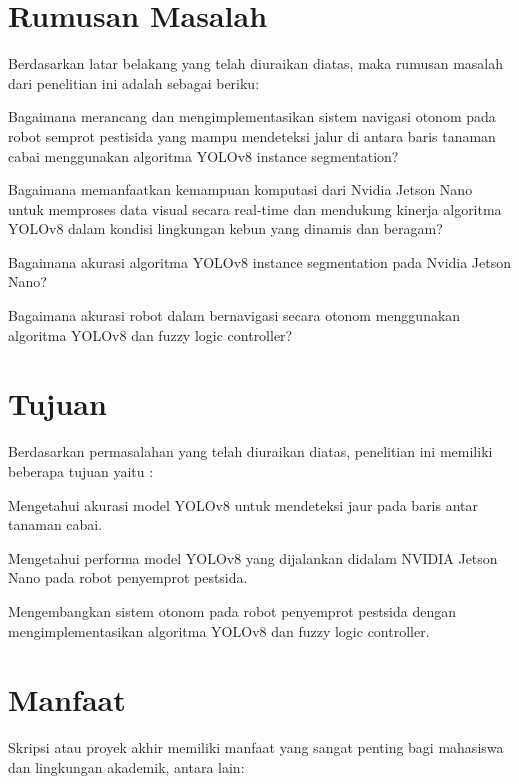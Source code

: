 \section{Rumusan Masalah}
Berdasarkan latar belakang yang telah diuraikan diatas, maka rumusan
masalah dari penelitian ini adalah sebagai beriku:
\begin{packed_enum}
	\item Bagaimana merancang dan mengimplementasikan sistem navigasi otonom pada robot semprot pestisida yang mampu mendeteksi jalur di antara baris tanaman cabai menggunakan algoritma YOLOv8 instance segmentation?
	\item Bagaimana memanfaatkan kemampuan komputasi dari Nvidia Jetson Nano untuk memproses data visual secara real-time dan mendukung kinerja algoritma YOLOv8 dalam kondisi lingkungan kebun yang dinamis dan beragam?
	\item Bagaimana akurasi  algoritma YOLOv8 instance segmentation pada Nvidia Jetson Nano?
	\item Bagaimana akurasi robot dalam bernavigasi secara otonom menggunakan algoritma YOLOv8 dan  fuzzy logic controller? 
\end{packed_enum}

\section{Tujuan}
Berdasarkan permasalahan yang telah diuraikan diatas, penelitian ini
memiliki beberapa tujuan yaitu :
\begin{packed_enum}
	\item Mengetahui akurasi model YOLOv8 untuk mendeteksi jaur pada  baris antar tanaman cabai.
	\item Mengetahui performa  model YOLOv8 yang dijalankan didalam NVIDIA Jetson Nano pada robot penyemprot pestsida.
	\item Mengembangkan sistem otonom pada robot penyemprot pestsida dengan mengimplementasikan algoritma YOLOv8 dan fuzzy logic controller.
\end{packed_enum}

\section{Manfaat}
Skripsi atau proyek akhir memiliki manfaat yang sangat penting bagi mahasiswa dan lingkungan akademik, antara lain:

